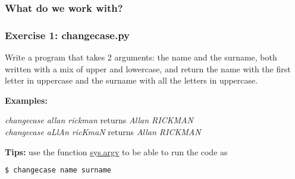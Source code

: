 %
%
%



\begin{frame}[c]
\frametitle{What do we work with?}
\huge
\faLaptop

\vfill 

\end{frame}


\begin{frame}[c, fragile]
\frametitle{Exercise 1: changecase.py}

\exercise

Write a program that takes 2 arguments: the name and the surname, both written with a mix of upper and lowercase, and return the name with the first letter in uppercase and the surname with all the letters in uppercase.

\textbf{Examples:}

\textit{changecase allan rickman} \hspace{1cm} returns \hspace{1cm}  \textit{Allan RICKMAN} \\
\textit{changecase aLlAn ricKmaN} \hspace{1cm} returns \hspace{1cm}  \textit{Allan RICKMAN} 

\vspace{1cm}

\textbf{Tips:} use the function \href{https://docs.python.org/2/library/sys.html#sys.argv}{sys.argv} to be able to run the code as 
\begin{lstlisting}[language=bash]
$ changecase name surname
\end{lstlisting}


\end{frame}

